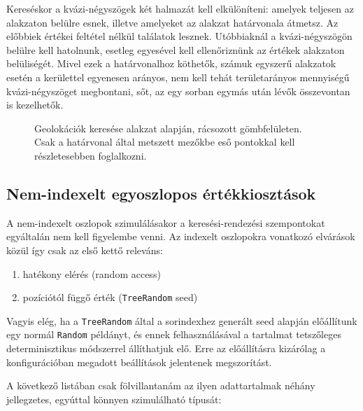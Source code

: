 \documentclass[
    parspace,
    noindent,
    nohyp,
]{elteiktdk}[2023/04/10]
\begin{document}
Kereséskor a kvázi-négyszögek két halmazát kell elkülöníteni:
amelyek teljesen az alakzaton belülre esnek,
illetve amelyeket az alakzat határvonala átmetsz.
Az előbbiek értékei feltétel nélkül találatok lesznek.
Utóbbiaknál a kvázi-négyszögön belülre kell hatolnunk,
esetleg egyesével kell ellenőriznünk az értékek alakzaton belüliségét.
Mivel ezek a határvonalhoz köthetők,
számuk egyszerű alakzatok esetén a kerülettel egyenesen arányos,
nem kell tehát területarányos mennyiségű kvázi-négyszöget megbontani,
sőt, az egy sorban egymás után lévők összevontan is kezelhetők.

\begin{figure}[H]
\centering

\caption{
  Geolokációk keresése alakzat alapján, rácsozott gömbfelületen. \\
  Csak a határvonal által metszett mezőkbe eső pontokkal kell részletesebben foglalkozni.
}
\end{figure}

\subsection{Nem-indexelt egyoszlopos értékkiosztások}

A nem-indexelt oszlopok szimulálásakor a keresési-rendezési szempontokat egyáltalán nem kell figyelembe venni.
Az indexelt oszlopokra vonatkozó elvárások közül így csak az első kettő releváns:

\begin{enumerate}
  \item hatékony elérés (random access)
  \item pozíciótól függő érték (\texttt{TreeRandom} seed)
\end{enumerate}

Vagyis elég, ha a \texttt{TreeRandom} által a sorindexhez generált seed alapján
előállítunk egy normál \texttt{Random} példányt,
és ennek felhasználásával a tartalmat tetszőleges determinisztikus módszerrel állíthatjuk elő.
Erre az előállításra kizárólag a konfigurációban megadott beállítások jelentenek megszorítást.

A következő listában csak fölvillantanám az ilyen adattartalmak néhány jellegzetes,
egyúttal könnyen szimulálható típusát:
\end{document}

